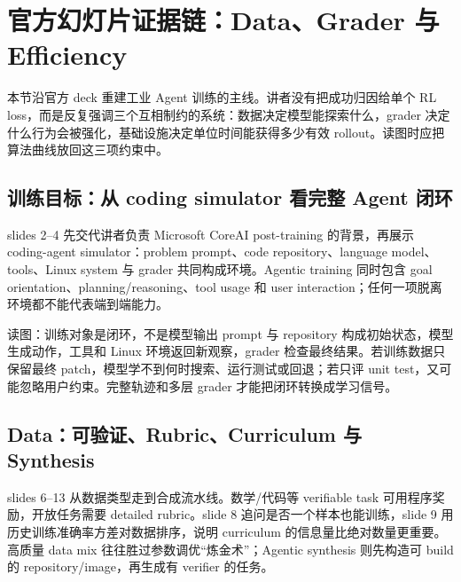 \section{官方幻灯片证据链：Data、Grader 与 Efficiency}

本节沿官方 deck 重建工业 Agent 训练的主线。讲者没有把成功归因给单个 RL loss，而是反复强调三个互相制约的系统：数据决定模型能探索什么，grader 决定什么行为会被强化，基础设施决定单位时间能获得多少有效 rollout。读图时应把算法曲线放回这三项约束中。

\subsection{训练目标：从 coding simulator 看完整 Agent 闭环}

slides 2--4 先交代讲者负责 Microsoft CoreAI post-training 的背景，再展示 coding-agent simulator：problem prompt、code repository、language model、tools、Linux system 与 grader 共同构成环境。Agentic training 同时包含 goal orientation、planning/reasoning、tool usage 和 user interaction；任何一项脱离环境都不能代表端到端能力。


\begin{knowledgebox}{读图：训练对象是闭环，不是模型输出}
prompt 与 repository 构成初始状态，模型生成动作，工具和 Linux 环境返回新观察，grader 检查最终结果。若训练数据只保留最终 patch，模型学不到何时搜索、运行测试或回退；若只评 unit test，又可能忽略用户约束。完整轨迹和多层 grader 才能把闭环转换成学习信号。
\end{knowledgebox}

\subsection{Data：可验证、Rubric、Curriculum 与 Synthesis}

slides 6--13 从数据类型走到合成流水线。数学/代码等 verifiable task 可用程序奖励，开放任务需要 detailed rubric。slide 8 追问是否一个样本也能训练，slide 9 用历史训练准确率方差对数据排序，说明 curriculum 的信息量比绝对数量更重要。高质量 data mix 往往胜过参数调优“炼金术”；Agentic synthesis 则先构造可 build 的 repository/image，再生成有 verifier 的任务。

